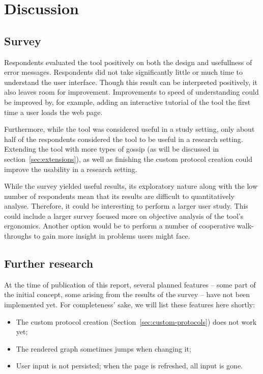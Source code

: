 
\section{Discussion}

\subsection{Survey}

Respondents evaluated the tool positively on both the design and usefullness of error messages.
Respondents did not take significantly little or much time to understand the user interface.
Though this result can be interpreted positively, it also leaves room for improvement.
Improvements to speed of understanding could be improved by, for example, adding an interactive tutorial of the tool the first time a user loads the web page.

Furthermore, while the tool was considered useful in a study setting, only about half of the respondents considered the tool to be useful in a research setting.
Extending the tool with more types of gossip (as will be discussed in section~\ref{sec:extensions}), as well as finishing the custom protocol creation could improve the usability in a research setting.

While the survey yielded useful results, its exploratory nature along with the low number of respondents mean that its results are difficult to quantitatively analyse.
Therefore, it could be interesting to perform a larger user study.
This could include a larger survey focused more on objective analysis of the tool's ergonomics.
Another option would be to perform a number of cooperative walk-throughs to gain more insight in problems users might face.

\subsection{Further research}

At the time of publication of this report, several planned features -- some part of the initial concept, some arising from the results of the survey -- have not been implemented yet. For completeness' sake, we will list these features here shortly:

\begin{itemize}
    \item The custom protocol creation (Section~\ref{sec:custom-protocols}) does not work yet;
    \item The rendered graph sometimes jumps when changing it;
    \item User input is not persisted; when the page is refreshed, all input is gone.
\end{itemize}

